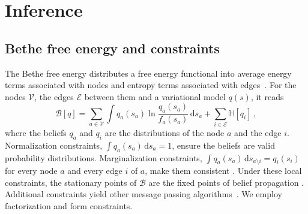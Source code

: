 \documentclass{l4dc2027}
\def\rmd{\mathrm{d}}
\begin{document}
\section{Inference}\label{sec:cbfe}


\subsection{Bethe free energy and constraints}

The Bethe free energy distributes a free energy functional into average energy terms associated with nodes and entropy terms associated with edges~\citep{yedidia2005constructing,csenoz2021variational}. For the nodes $\mathcal{V}$, the edges $\mathcal{E}$ between them and a variational model $q(s)$, it reads
\begin{equation}\label{eq:bethe}
	\mathcal{B}[q] = \sum_{a \in \mathcal{V}} \int q_a(s_a) \ln \frac{q_a(s_a)}{f_a(s_a)}\, \rmd s_a + \sum_{i \in \mathcal{E}} \mathbb{H}[q_i] \, ,
\end{equation}
where the beliefs $q_a$ and $q_i$ are the distributions of the node $a$ and the edge $i$. Normalization constraints, $\int q_a(s_a)\, \rmd s_a = 1$, ensure the beliefs are valid probability distributions. Marginalization constraints, $\int q_a(s_a)\, \rmd s_{a \setminus i} = q_i(s_i)$ for every node $a$ and every edge $i$ of $a$, make them consistent \citep{csenoz2021variational}.
Under these local constraints, the stationary points of $\mathcal{B}$ are the fixed points of belief propagation \citep{heskes2002stable}. Additional constraints yield other message passing algorithms~\citep{yedidia2005constructing}. We employ factorization and form constraints.
\end{document}
